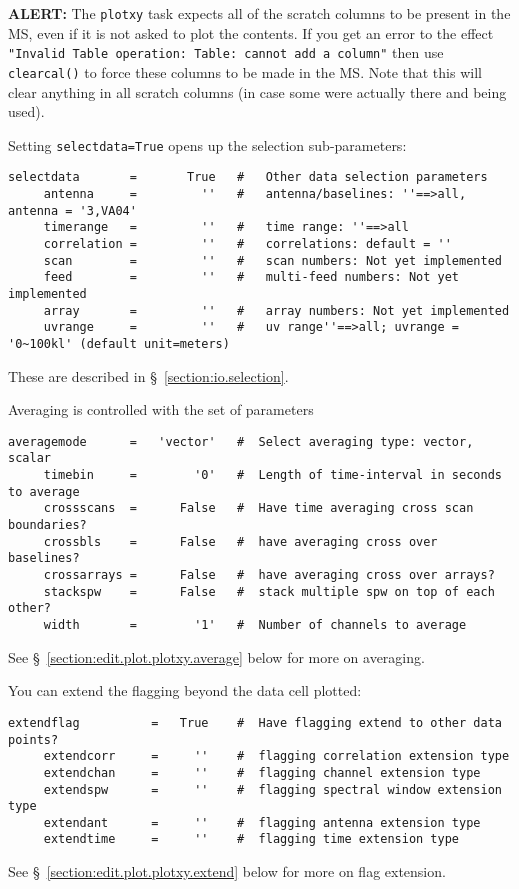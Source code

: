 {\bf ALERT:} The {\tt plotxy} task expects all of the scratch columns to
be present in the MS, even if it is not asked to plot the contents.
If you get an error to the effect {\tt "Invalid Table operation:
Table: cannot add a column"} then use {\tt clearcal()} to force these
columns to be made in the MS.  Note that this will clear anything in
all scratch columns (in case some were actually there and being used).

Setting {\tt selectdata=True} opens up the selection sub-parameters:
\small
\begin{verbatim}
selectdata       =       True   #   Other data selection parameters
     antenna     =         ''   #   antenna/baselines: ''==>all, antenna = '3,VA04' 
     timerange   =         ''   #   time range: ''==>all 
     correlation =         ''   #   correlations: default = '' 
     scan        =         ''   #   scan numbers: Not yet implemented
     feed        =         ''   #   multi-feed numbers: Not yet implemented
     array       =         ''   #   array numbers: Not yet implemented
     uvrange     =         ''   #   uv range''==>all; uvrange = '0~100kl' (default unit=meters)
\end{verbatim}
\normalsize
These are described in \S~\ref{section:io.selection}.

Averaging is controlled with the set of parameters
\small
\begin{verbatim}
averagemode      =   'vector'   #  Select averaging type: vector, scalar
     timebin     =        '0'   #  Length of time-interval in seconds to average
     crossscans  =      False   #  Have time averaging cross scan boundaries?
     crossbls    =      False   #  have averaging cross over baselines?
     crossarrays =      False   #  have averaging cross over arrays?
     stackspw    =      False   #  stack multiple spw on top of each other?
     width       =        '1'   #  Number of channels to average
\end{verbatim}
\normalsize
See \S~\ref{section:edit.plot.plotxy.average} below for more on averaging.

You can extend the flagging beyond the data cell plotted:
\small
\begin{verbatim}
extendflag          =   True    #  Have flagging extend to other data points?
     extendcorr     =     ''    #  flagging correlation extension type
     extendchan     =     ''    #  flagging channel extension type
     extendspw      =     ''    #  flagging spectral window extension type
     extendant      =     ''    #  flagging antenna extension type
     extendtime     =     ''    #  flagging time extension type
\end{verbatim}
\normalsize
See \S~\ref{section:edit.plot.plotxy.extend} below for more on flag
extension.

